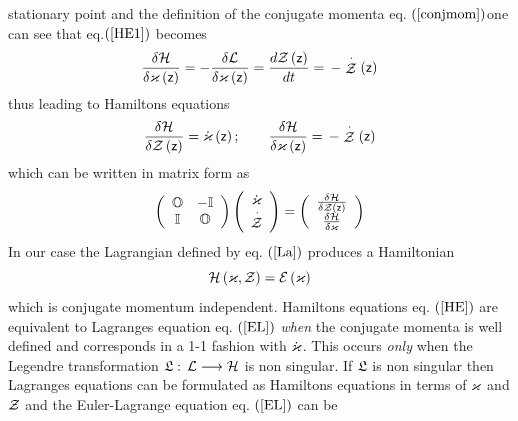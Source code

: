 stationary point and the definition of the conjugate momenta eq. $\left( \ref%
{conjmom}\right) $one can see that eq.$\left( \ref{HE1}\right) $ becomes 
\begin{equation}
\frac{\delta {\cal H}}{\delta {\cal \varkappa }\left( {\sf z}\right) }=-%
\frac{\delta {\cal L}}{\delta {\cal \varkappa }\left( {\sf z}\right) }=\frac{%
d{\cal Z}\left( {\sf z}\right) }{dt}=\,-\stackrel{\cdot }{{\cal Z}}\left( 
{\sf z}\right) 
\end{equation}%
thus leading to Hamiltons equations 
\begin{equation}
\frac{\delta {\cal H}}{\delta {\cal Z}\left( {\sf z}\right) }={\cal \dot{%
\varkappa}}\left( {\sf z}\right) ;\qquad \frac{\delta {\cal H}}{\delta {\cal %
\varkappa }\left( {\sf z}\right) }=\,-\stackrel{\cdot }{{\cal Z}}\left( {\sf %
z}\right) 
\end{equation}%
which can be written in matrix form as 
\begin{equation}
\left( 
\begin{array}{cc}
{\Bbb O} & -{\Bbb I} \\ 
{\Bbb I} & {\Bbb O}%
\end{array}%
\right) \left( 
\begin{array}{c}
{\cal \dot{\varkappa}} \\ 
\stackrel{\cdot }{{\cal Z}}%
\end{array}%
\right) =\left( 
\begin{array}{c}
\frac{\delta {\cal H}}{\delta {\cal Z}\left( {\sf z}\right) } \\ 
\frac{\delta {\cal H}}{\delta {\cal \varkappa }}%
\end{array}%
\right) 
\end{equation}%
In our case the Lagrangian defined by eq. $\left( \ref{La}\right) $ produces
a Hamiltonian 
\begin{equation}
{\cal H}\left( {\cal \varkappa },{\cal Z}\right) ={\cal E}\left( {\cal %
\varkappa }\right) 
\end{equation}%
which is conjugate momentum independent. Hamiltons equations eq. $\left( \ref%
{HE}\right) $ are equivalent to Lagranges equation eq. $\left( \ref{EL}%
\right) $ {\em when} the conjugate momenta is well defined and corresponds
in a 1-1 fashion with ${\cal \dot{\varkappa}}$. This occurs {\em only} when
the Legendre transformation ${\frak L}:$ ${\cal L\longrightarrow H}$ is non
singular. If ${\frak L}$ is non singular then Lagranges equations can be
formulated as Hamiltons equations in terms of ${\cal \varkappa }$ and ${\cal %
Z}$ and the Euler-Lagrange equation eq. $\left( \ref{EL}\right) $ can be
